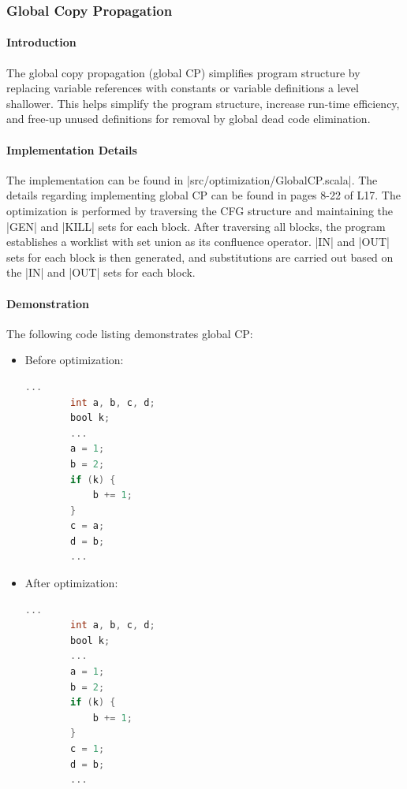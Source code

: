 \subsubsection{Global Copy Propagation}

\paragraph{Introduction}

The global copy propagation (global CP) simplifies program structure by replacing variable references with constants or variable definitions a level shallower. This helps simplify the program structure, increase run-time efficiency, and free-up unused definitions for removal by global dead code elimination.

\paragraph{Implementation Details}

The implementation can be found in |src/optimization/GlobalCP.scala|. The details regarding implementing global CP can be found in pages 8-22 of L17. The optimization is performed by traversing the CFG structure and maintaining the |GEN| and |KILL| sets for each block. After traversing all blocks, the program establishes a worklist with set union as its confluence operator. |IN| and |OUT| sets for each block is then generated, and substitutions are carried out based on the |IN| and |OUT| sets for each block.

\paragraph{Demonstration}

The following code listing demonstrates global CP:

\begin{itemize}
    \item Before optimization:
    \begin{lstlisting}[language=C]
        ...
        int a, b, c, d;
        bool k;
        ...
        a = 1;
        b = 2;
        if (k) {
            b += 1;
        }
        c = a;
        d = b;
        ...
    \end{lstlisting}
    \item After optimization:
    \begin{lstlisting}[language=C]
        ...
        int a, b, c, d;
        bool k;
        ...
        a = 1;
        b = 2;
        if (k) {
            b += 1;
        }
        c = 1;
        d = b;
        ...
    \end{lstlisting}
\end{itemize}

